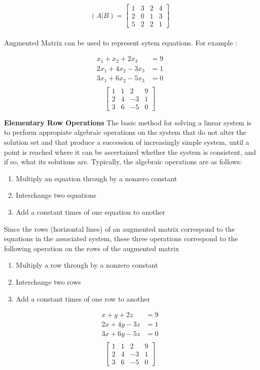 \documentclass[a4paper, 12pt]{article}
\begin{document}
$$
(A|B) = 
\begin{bmatrix}
1 & 3 & 2 & 4\\
2 & 0 & 1 & 3\\
5 & 2 & 2 & 1
\end{bmatrix}
$$
\\
Augmented Matrix can be used to represent sytem equations.
For example :
\begin{multicols}{2}
\begin{align*}
x_1 + x_2 + 2x_3 &= 9 \\
2x_1 + 4x_2 - 3x_3 &= 1 \\
3x_1 + 6x_2 - 5x_3 &= 0\\
\end{align*}
\break
\[ \left[ {\begin{array}{cccc}
1 & 1 & 2 & 9 \\
2 & 4 & -3 & 1 \\
3 & 6 & -5 & 0
\end{array}} \right] \]
\end{multicols}

\textbf{Elementary Row Operations}
The basic method for solving a linear system is to perform appropiate 
algebraic operations on the system that do not alter the solution set 
and that produce a succession of increasingly simple system, until a 
point is reached where it can be ascertained whether the system is 
consistent, and if so, what its solutions are. Typically, the algebraic
operations are as follows:
\begin{enumerate}
\item Multiply an equation through by a nonzero constant
\item Interchange two equations
\item Add a constant times of one equation to another 
\end{enumerate}

Since the rows (horizontal lines) of an augmented matrix correspond
to the equations in the associated system, these three operations 
correspond to the following operation on the rows of the augmented
matrix 
\begin{enumerate}
\item Multiply a row through by a nonzero constant
\item Interchange two rows
\item Add a constant times of one row to another 
\end{enumerate}

\begin{multicols}{2}
\begin{align*}
x + y + 2z &= 9 \\
2x + 4y - 3z &= 1 \\
3x + 6y - 5z  &= 0\\
\end{align*}
\break
\[ \left[ {\begin{array}{cccc}
1 & 1 & 2 & 9 \\
2 & 4 & -3 & 1 \\
3 & 6 & -5 & 0
\end{array}} \right] \]
\end{multicols}
\end{document}
